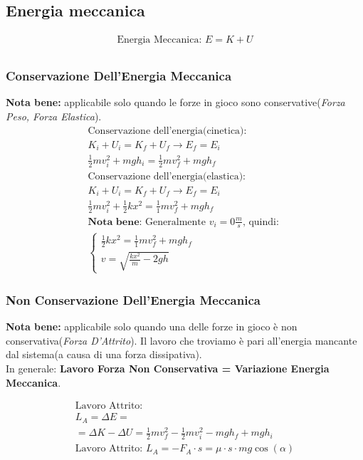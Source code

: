 \subsection{Energia meccanica}

\begin{gather*}
    \text{Energia Meccanica: } E = K + U \\
\end{gather*}
\subsubsection{Conservazione Dell'Energia Meccanica}
\textbf{Nota bene: } applicabile solo quando le forze in gioco sono conservative(\textit{Forza Peso, Forza Elastica}).
\begin{gather*}
    \text{Conservazione dell'energia(cinetica): } \\ K_i + U_i = K_f + U_f \rightarrow E_f = E_i \\ \frac{1}{2} m v_i^2 + mgh_i = \frac{1}{2} mv_f^2 + mgh_f \\
    \text{Conservazione dell'energia(elastica): } \\ K_i + U_i = K_f + U_f \rightarrow E_f = E_i \\ \frac{1}{2} m v_i^2 + \frac{1}{2}kx^2 = \frac{1}{1}mv_f^2 + mgh_f \\
    \textbf{Nota bene: }\text{Generalmente $v_i = 0 \frac{m}{s}$, quindi: } \\
    \begin{cases}
        \frac{1}{2}kx^2 = \frac{1}{1}mv_f^2 + mgh_f \\
        v = \sqrt{\frac{k x^2}{m} - 2gh}
    \end{cases}
\end{gather*}

\subsubsection{Non Conservazione Dell'Energia Meccanica}

\textbf{Nota bene: } applicabile solo quando una delle forze in gioco è non conservativa(\textit{Forza D'Attrito}). Il lavoro che troviamo è pari all'energia mancante dal sistema(a causa di una forza dissipativa). \\
In generale: \textbf{Lavoro Forza Non Conservativa = Variazione Energia Meccanica}.

\begin{gather*}
    \text{Lavoro Attrito: } \\ L_A = \Delta E = \\ = \Delta K - \Delta U = \frac{1}{2} m v_f^2 - \frac{1}{2} m v_i^2 - mgh_f + mgh_i \\
    \text{Lavoro Attrito: } L_A = - F_{A} \cdot s = \mu \cdot s \cdot m g \cos (\alpha)
\end{gather*}